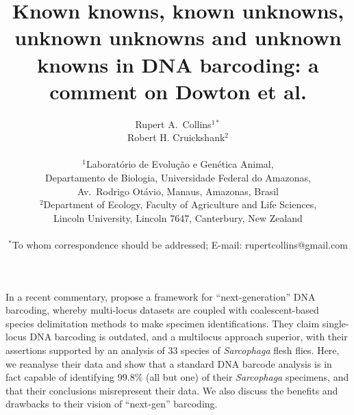 \documentclass[12pt]{article}
\title{\bf Known knowns, known unknowns, unknown unknowns and unknown knowns in DNA barcoding: a comment on Dowton et al.}
\author
{Rupert A.\ Collins$^{1*}$\\
Robert H. Cruickshank$^{2}$\\
\\
\normalsize{$^{1}$Laborat\'orio de Evolu\c c\~ao e Gen\'etica Animal,}\\
\normalsize{Departamento de Biologia, Universidade Federal do Amazonas,}\\
\normalsize{Av.\ Rodrigo Ot\'avio, Manaus, Amazonas, Brasil}\\
\normalsize{$^{2}$Department of Ecology, Faculty of Agriculture and Life Sciences,}\\
\normalsize{Lincoln University,  Lincoln 7647,  Canterbury, New Zealand}\\
\\
\normalsize{$^\ast$To whom correspondence should be addressed; E-mail:  rupertcollins@gmail.com}
}
\date{}
\newenvironment{sciabstract}{%
\begin{quote} }
{\end{quote}}
\begin{document}
 
\maketitle 



%
%
%
%
%

In a recent commentary, \citet{Dowton2014} propose a framework for “next-generation” DNA barcoding, whereby multi-locus datasets are coupled with coalescent-based species delimitation methods to make specimen identifications. They claim single-locus DNA barcoding is outdated, and a multilocus approach superior, with their assertions supported by an analysis of 33 species of \emph{Sarcophaga} flesh flies. Here, we reanalyse their data and show that a standard DNA barcode analysis is in fact capable of identifying 99.8\% (all but one) of their \emph{Sarcophaga} specimens, and that their conclusions misrepresent their data. We also discuss the benefits and drawbacks to their vision of ``next-gen'' barcoding.
\end{document}
